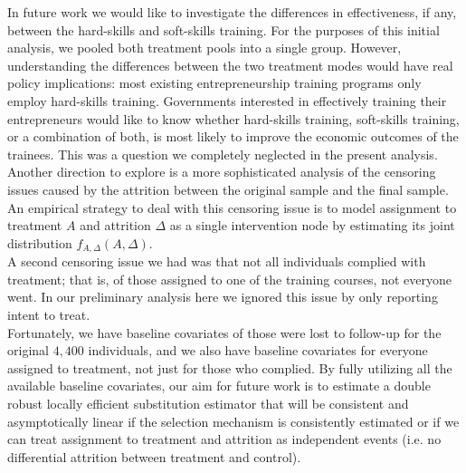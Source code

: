 In future work we would like to investigate the differences in effectiveness, if any, between the hard-skills and soft-skills training. For the purposes of this initial analysis, we pooled both treatment pools into a single group. However, understanding the differences between the two treatment modes would have real policy implications: most existing entrepreneurship training programs only employ hard-skills training. Governments interested in effectively training their entrepreneurs would like to know whether hard-skills training, soft-skills training, or a combination of both, is most likely to improve the economic outcomes of the trainees. This was a question we completely neglected in the present analysis.\\

Another direction to explore is a more sophisticated analysis of the censoring issues caused by the attrition between the original sample and the final sample. An empirical strategy to deal with this censoring issue is to model assignment to treatment $A$ and attrition $\Delta$ as a single intervention node by estimating its joint distribution $f_{A,\Delta}(A,\Delta)$.\\

A second censoring issue we had was that not all individuals complied with treatment; that is, of those assigned to one of the training courses, not everyone went. In our preliminary analysis here we ignored this issue by only reporting intent to treat.\\

Fortunately, we have baseline covariates of those were lost to follow-up for the original $4,400$ individuals, and we also have baseline covariates for everyone assigned to treatment, not just for those who complied. By fully utilizing all the available baseline covariates, our aim for future work is to estimate a double robust locally efficient substitution estimator that will be consistent and asymptotically linear if the selection mechanism is consistently estimated or if we can treat assignment to treatment and attrition as independent events (i.e. no differential attrition between treatment and control).


